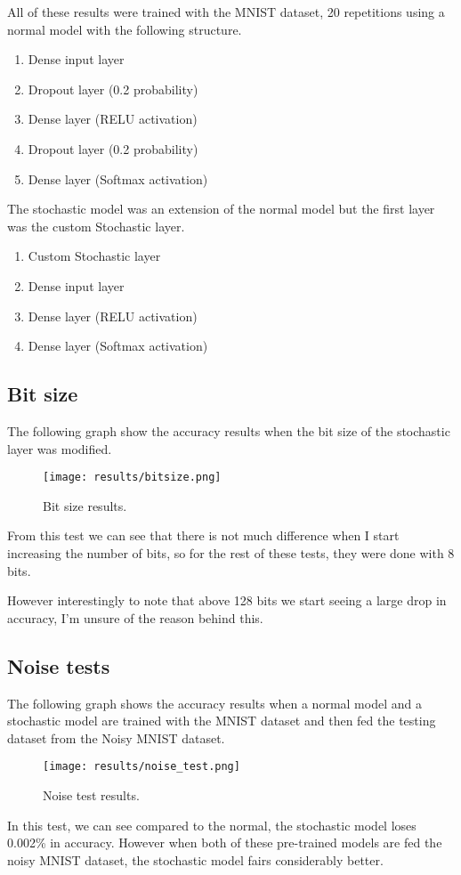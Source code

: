 \documentclass[a4paper,oneside,phd,etd]{BYUPhys}
\begin{document}
All of these results were trained with the MNIST dataset, 20 repetitions using a normal model with the following structure.
\begin{enumerate}
    \item Dense input layer
    \item Dropout layer (0.2 probability)
    \item Dense layer (RELU activation)
    \item Dropout layer (0.2 probability)
    \item Dense layer (Softmax activation)
\end{enumerate}
The stochastic model was an extension of the normal model but the first layer was the custom Stochastic layer.
\begin{enumerate}
    \item Custom Stochastic layer
    \item Dense input layer
    \item Dense layer (RELU activation)
    \item Dense layer (Softmax activation)
\end{enumerate}


\subsection{Bit size}
The following graph show the accuracy results when the bit size of the stochastic layer was modified.
\begin{figure}[H]
\centering
\texttt{[image: results/bitsize.png]}
\caption{Bit size results.}
\label{fig:bitsize}
\end{figure}
From this test we can see that there is not much difference when I start increasing the number of bits, so for the rest of these tests, they were done with 8 bits.

However interestingly to note that above 128 bits we start seeing a large drop in accuracy, I'm unsure of the reason behind this.

\subsection{Noise tests}
The following graph shows the accuracy results when a normal model and a stochastic model are trained with the MNIST dataset and then fed the testing dataset from the Noisy MNIST dataset.
\begin{figure}[H]
\centering
\texttt{[image: results/noise\_test.png]}
\caption{Noise test results.}
\label{fig:noise}
\end{figure}
In this test, we can see compared to the normal, the stochastic model loses 0.002\% in accuracy. However when both of these pre-trained models are fed the noisy MNIST dataset, the stochastic model fairs considerably better.
\end{document}
